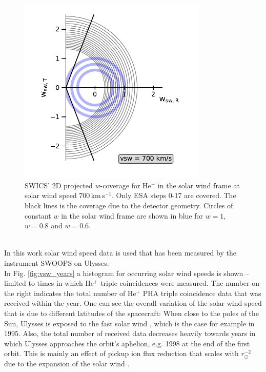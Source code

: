 \begin{figure}[h]
	\includegraphics[width=0.8\textwidth]{Figures/covv.pdf}
	\centering
	\caption{SWICS' 2D projected $w$-coverage for $\mathrm{He^{+}}$ in the solar wind frame at solar wind speed $700\,\mathrm{km\,s^{-1}}$. Only ESA steps 0-17 are covered. The black lines is the coverage due to the detector geometry. Circles of constant $w$ in the solar wind frame are shown in blue for $w = 1$, $w = 0.8$ and $w = 0.6$.}
	\label{fig:cov}
\end{figure}
\\
In this work solar wind speed data is used that has been measured by the instrument SWOOPS \citep[Solar Wind Observations Over the Poles of the Sun,][]{bame_swoops} on Ulysses. \\ 
In Fig. \ref{fig:vsw_years} a histogram for occurring solar wind speeds is shown -- limited to times in which $\mathrm{He^{+}}$ triple coincidences were measured.  The number on the right indicates the total number of $\mathrm{He^{+}}$ PHA triple coincidence data that was received within the year. One can see the overall variation of the solar wind speed that is due to different latitudes of the spacecraft: When close to the poles of the Sun, Ulysses is exposed to the fast solar wind \citep{mccomas_2004}, which is the case for example in 1995. Also, the total number of received data decreases heavily towards years in which Ulysses approaches the orbit's aphelion, e.g. 1998 at the end of the first orbit. This is mainly an effect of pickup ion flux reduction that scales with $r_\odot^{-2}$ due to the expansion of the solar wind \citep[][,ch. 6.1]{prlss_2004}.

